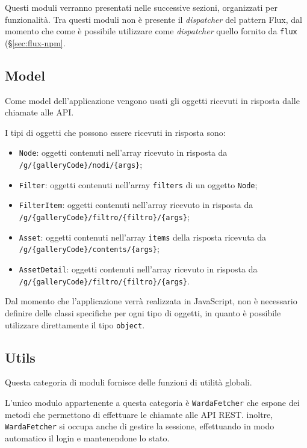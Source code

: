 Questi moduli verranno presentati nelle successive sezioni, organizzati per funzionalità.
Tra questi moduli non è presente il \textit{dispatcher} del pattern Flux, dal momento che come è possibile utilizzare come \textit{dispatcher} quello fornito da \texttt{flux} (§\ref{sec:flux-npm}.

\subsection{Model}

Come model dell'applicazione vengono usati gli oggetti ricevuti in risposta dalle chiamate alle API.

I tipi di oggetti che possono essere ricevuti in risposta sono:
\begin{itemize}
\item \texttt{Node}: oggetti contenuti nell'array ricevuto in risposta da \texttt{/g/\{galleryCode\}/nodi/\{args\}};
\item \texttt{Filter}: oggetti contenuti nell'array \texttt{filters} di un oggetto \texttt{Node};
\item \texttt{FilterItem}: oggetti contenuti nell'array ricevuto in risposta da \texttt{/g/\{galleryCode\}/filtro/\{filtro\}/\{args\}};
\item \texttt{Asset}: oggetti contenuti nell'array \texttt{items} della risposta ricevuta da \texttt{/g/\{galleryCode\}/contents/\{args\}};
\item \texttt{AssetDetail}: oggetti contenuti nell'array ricevuto in risposta da \texttt{/g/\{galleryCode\}/filtro/\{filtro\}/\{args\}}.
\end{itemize}

Dal momento che l'applicazione verrà realizzata in JavaScript, non è necessario definire delle classi specifiche per ogni tipo di oggetti, in quanto è possibile utilizzare direttamente il tipo \texttt{object}.

\subsection{Utils}

Questa categoria di moduli fornisce delle funzioni di utilità globali.

L'unico modulo appartenente a questa categoria è \texttt{WardaFetcher} che espone dei metodi che permettono di effettuare le chiamate alle API REST.
inoltre, \texttt{WardaFetcher} si occupa anche di gestire la sessione, effettuando in modo automatico il login e mantenendone lo stato.

